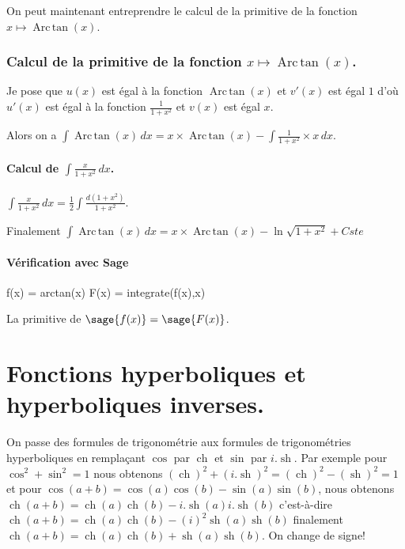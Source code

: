 \documentclass[a4paper,14pt]{extreport} %
\renewcommand{\sinh}{\mathop{\mathrm{sh}}}
\renewcommand{\cosh}{\mathop{\mathrm{ch}}}
\renewcommand{\arctan}{\mathop{\mathrm{Arc\,tan}}}
\begin{document}
On peut maintenant entreprendre le calcul de la primitive de la  fonction  $x \mapsto \arctan(x) $.






\subsection{Calcul de la primitive de la fonction  $x \mapsto \arctan(x) $.}



Je pose que $u(x)$  est égal à la fonction $\arctan(x)$ et $v'(x)$ est égal $1$  d'où $u'(x)$  est égal à la fonction $ \frac{1}{1+ x^2} $ et $v(x)$ est égal $x$.

Alors on a $\int \arctan(x) \, dx = x \times \arctan(x) -\int \frac{1}{1+x^2} \times x \, dx $.






\subsubsection{Calcul de $\int \frac{x}{1+ x^2} \, dx $.}

$\int \frac{x}{1+ x^2} \, dx = \frac{1}{2} \int \frac{d(1+x^2)}{1+ x^2} $.


Finalement $\int \arctan(x) \, dx = x \times \arctan(x) -\ln{ \sqrt{1+ x^2}} + Cste $

\subsubsection{Vérification avec Sage}

\begin{sageblock}
    f(x) = arctan(x)
    F(x) = integrate(f(x),x)
\end{sageblock}

La primitive de $\sage{f(x)} = \sage{F(x)} $.



\chapter{Fonctions hyperboliques et hyperboliques inverses.}


On passe des formules de trigonométrie aux formules de trigonométries hyperboliques en remplaçant $\cos$ par $\cosh$ et $\sin$ par $i . \sinh$. Par exemple pour $\cos^2+\sin^2=1$
nous obtenons $(\cosh)^2 + (i . \sinh)^2= (\cosh)^2 - (\sinh)^2 = 1$ et pour $\cos(a+b)=\cos(a) \cos(b) - \sin(a) \sin(b) $, nous obtenons $\cosh(a+b)=\cosh(a) \cosh(b) - i .\sinh(a) i . \sinh(b) $ c'est-à-dire $\cosh(a+b)=\cosh(a) \cosh(b) - (i)^2 \sinh(a) \sinh(b) $ finalement $\cosh(a+b) = \cosh(a) \cosh(b) + \sinh(a) \sinh(b) $. On change de signe!
\end{document}

